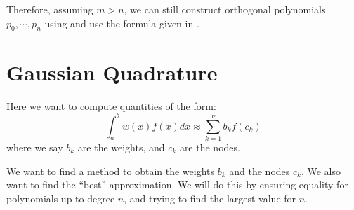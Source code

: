 \documentclass[../Main.tex]{subfiles}
\begin{document}
Therefore, assuming $m > n$, we can still construct orthogonal polynomials $p_0, \cdots, p_n$ using  and use the formula given in .
\section{Gaussian Quadrature}
Here we want to compute quantities of the form:
\begin{equation}
    \int_{a}^{b} w(x) f(x) dx \approx \sum_{k=1}^{\nu} b_k f(c_k)
    \label{eqnGaussQuadrat}
\end{equation}
where we say $b_k$ are the weights, and $c_k$ are the nodes.

We want to find a method to obtain the weights $b_k$ and the nodes $c_k$. We also want to find the ``best'' approximation. We will do this by ensuring equality for polynomials up to degree $n$, and trying to find the largest value for $n$.
\end{document}
